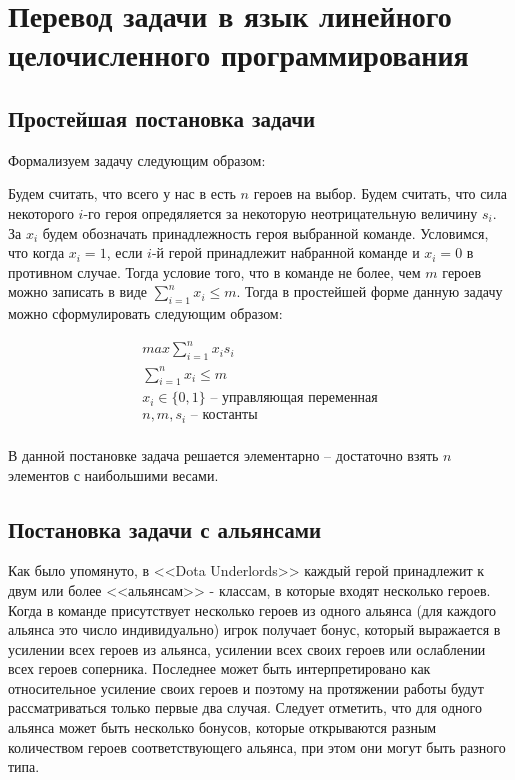 \documentclass{article}
\begin{document}
\section{Перевод задачи в язык линейного целочисленного программирования }
\label{SectionDUIP}

\subsection{Простейшая постановка задачи}

Формализуем задачу следующим образом:

Будем считать, что всего у нас в есть $n$ героев на выбор. Будем считать, что сила некоторого $i$-го героя опредяляется за некоторую неотрицательную величину $s_i$. За $x_i$ будем обозначать принадлежность героя выбранной команде. Условимся, что когда $x_i = 1$, если $i$-й герой принадлежит набранной команде и $x_i=0$ в противном случае. Тогда условие того, что в команде не более, чем $m$ героев можно записать в виде $\sum_{i=1}^n x_i \leq m$. Тогда в простейшей форме данную задачу можно сформулировать следующим образом:

\begin{equation}
\begin{gathered}
    max \sum_{i=1}^n x_i s_i \\
    \sum_{i=1}^n x_i \leq m \\
    x_i \in \{0, 1\} \text{ – управляющая переменная} \\
   n, m, s_i \text{ – костанты}  \\
\end{gathered}
\end{equation}

В данной постановке задача решается элементарно – достаточно взять $n$ элементов с наибольшими весами.

\subsection{Постановка задачи с альянсами}
Как было упомянуто, в <<Dota Underlords>>  каждый герой принадлежит к двум или более <<альянсам>> - классам, в которые входят несколько героев.  Когда в команде присутствует несколько героев из одного альянса (для каждого альянса это число индивидуально) игрок получает бонус, который выражается в усилении всех героев из альянса, усилении всех своих героев или ослаблении всех героев соперника. Последнее может быть интерпретировано как относительное усиление своих героев и поэтому на протяжении работы будут рассматриваться только первые два случая. Следует отметить, что для одного альянса может быть несколько бонусов, которые открываются разным количеством героев соответствующего альянса, при этом они могут быть разного типа.
\end{document}
